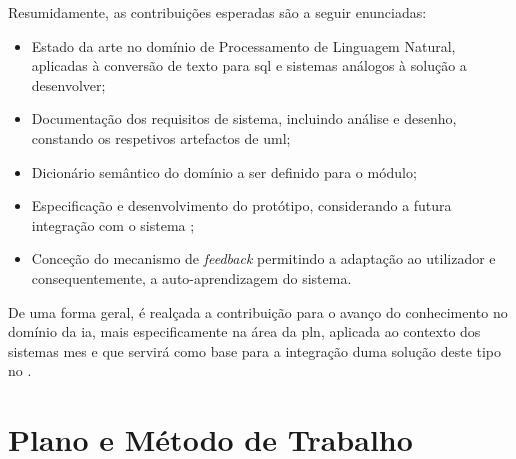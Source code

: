 Resumidamente, as contribuições esperadas são a seguir enunciadas:

\begin{itemize}
    \item
    {
        Estado da arte no domínio de Processamento de Linguagem Natural, aplicadas à conversão de texto para \gls{sql} e sistemas análogos à solução a desenvolver;
    }
    \item 
    {
        Documentação dos requisitos de sistema, incluindo análise e desenho, constando os respetivos artefactos de \gls{uml};
    }
    \item 
    {
        Dicionário semântico do domínio a ser definido para o módulo;
    }
    \item
    {
        Especificação e desenvolvimento do protótipo, considerando a futura integração com o sistema {\productname};
    }
    \item
    {
        Conceção do mecanismo de \textit{feedback} permitindo a adaptação ao utilizador e consequentemente, a auto-aprendizagem do sistema.
    }
\end{itemize}

De uma forma geral, é realçada a contribuição para o avanço do conhecimento no domínio da \gls{ia}, mais especificamente na área da \gls{pln}, aplicada ao contexto dos sistemas \gls{mes} e que servirá como base para a integração duma solução deste tipo no {\productname}.







\chapter{Plano e Método de Trabalho}
\label{chap:pre7}

